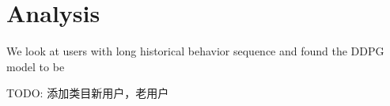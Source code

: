 \section{Analysis}
We look at users with long historical behavior sequence and found the DDPG model to be 

TODO: 添加类目新用户，老用户